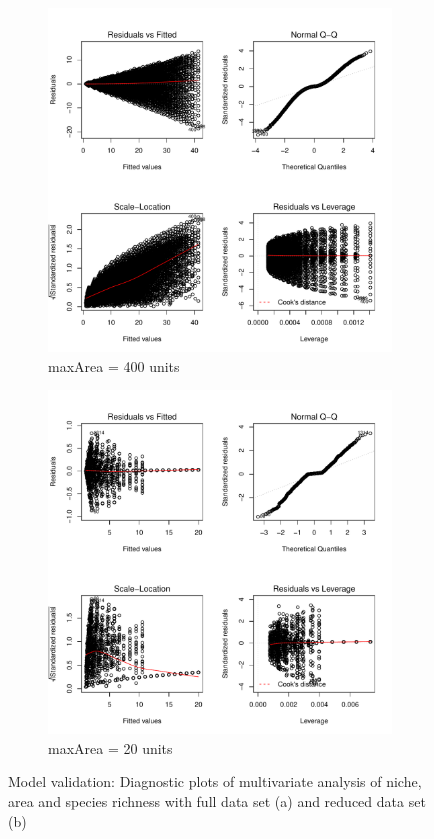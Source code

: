 \documentclass{article}
\begin{document}
\begin{figure}[h!]
  \centering
  \begin{subfigure}[b]{0.4\linewidth}
    \includegraphics[width=\linewidth]{../../../Results/Simulation2/NicheAreaLmPlot_1.pdf}
    \caption{maxArea = 400 units}
  \end{subfigure}
  \begin{subfigure}[b]{0.4\linewidth}
    \includegraphics[width=\linewidth]{../../../Results/Simulation2/NicheAreaLmPlot_20.pdf}
    \caption{maxArea = 20 units}
  \end{subfigure}
  \caption{Model validation: Diagnostic plots of multivariate analysis of niche, area and species richness with full data set (a) and reduced data set (b)}
  \label{fig:Model validation multivariate 2}
\end{figure}\bigskip
\end{document}
